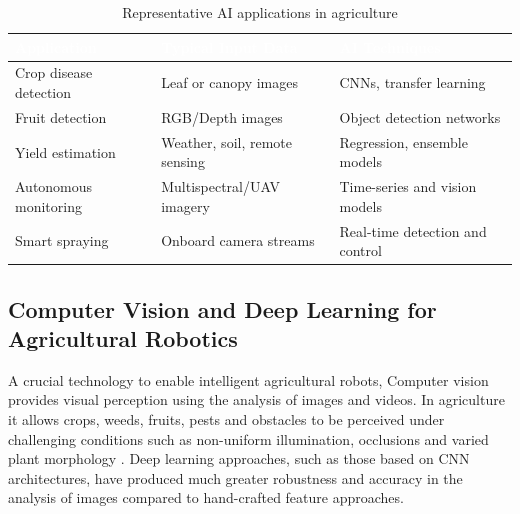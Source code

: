 \begin{table}[H]
\centering
\caption{Representative AI applications in agriculture}
\label{tab:ai_applications}
\small
\setlength{\extrarowheight}{5pt} %
 
\begin{tabularx}{\textwidth}{l X X}
\toprule
\rowcolor[HTML]{2C3E50} %
\textcolor{white}{\textbf{Application}} & 
\textcolor{white}{\textbf{Typical Input Data}} & 
\textcolor{white}{\textbf{AI Techniques}} \\
\midrule

Crop disease detection & Leaf or canopy images & CNNs, transfer learning \\

\rowcolor[HTML]{F2F4F4} %
Fruit detection        & RGB/Depth images & Object detection networks \\

Yield estimation       & Weather, soil, remote sensing & Regression, ensemble models \\

\rowcolor[HTML]{F2F4F4} %
Autonomous monitoring  & Multispectral/UAV imagery & Time-series and vision models \\

Smart spraying         & Onboard camera streams & Real-time detection and control \\
\bottomrule
\end{tabularx}
\end{table}

\subsection{Computer Vision and Deep Learning for Agricultural Robotics}

A crucial technology to enable intelligent agricultural robots, Computer vision provides visual perception using the analysis of images and videos. In agriculture it allows crops, weeds, fruits, pests and obstacles to be perceived under challenging conditions such as non-uniform illumination, occlusions and varied plant morphology \cite{AppsAgri2022}. Deep learning approaches, such as those based on CNN architectures, have produced much greater robustness and accuracy in the analysis of images compared to hand-crafted feature approaches.

